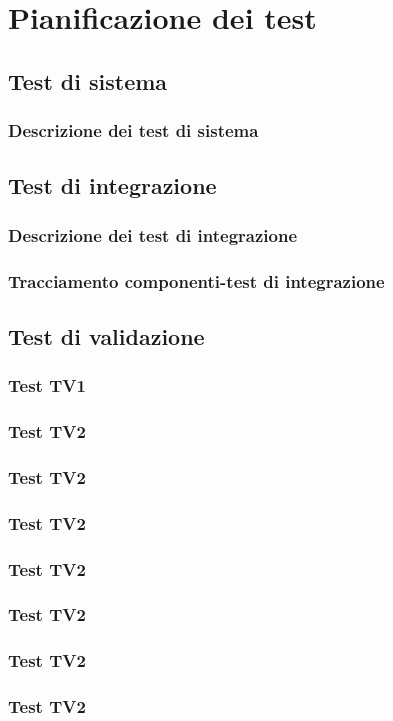 \section{Pianificazione dei test}
\subsection{Test di sistema}
\subsubsection{Descrizione dei test di sistema}
\subsection{Test di integrazione}
\subsubsection{Descrizione dei test di integrazione}
\subsubsection{Tracciamento componenti-test di integrazione}
\subsection{Test di validazione}
\subsubsection{Test TV1}
\subsubsection{Test TV2}
\subsubsection{Test TV2}
\subsubsection{Test TV2}
\subsubsection{Test TV2}
\subsubsection{Test TV2}
\subsubsection{Test TV2}
\subsubsection{Test TV2}
